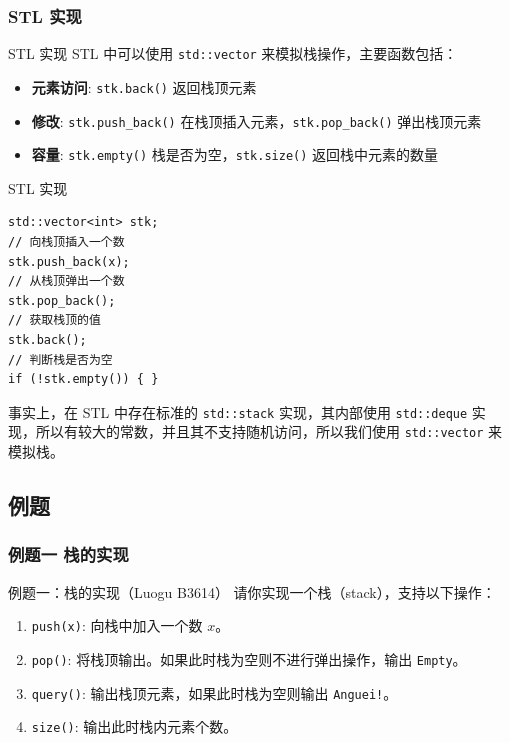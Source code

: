 \documentclass{beamer}
\begin{document}
\subsubsection{STL 实现}
\begin{frame}[fragile]{STL 实现}
    STL 中可以使用 \texttt{std::vector} 来模拟栈操作，主要函数包括：
    \begin{itemize}
        \item \textbf{元素访问}: \texttt{stk.back()} 返回栈顶元素
        \item \textbf{修改}: \texttt{stk.push_back()} 在栈顶插入元素，\texttt{stk.pop_back()} 弹出栈顶元素
        \item \textbf{容量}: \texttt{stk.empty()} 栈是否为空，\texttt{stk.size()} 返回栈中元素的数量
    \end{itemize}
\end{frame}

\begin{frame}[fragile]{STL 实现}
    \begin{verbatim}
std::vector<int> stk;
// 向栈顶插入一个数
stk.push_back(x);
// 从栈顶弹出一个数
stk.pop_back();
// 获取栈顶的值
stk.back();
// 判断栈是否为空
if (!stk.empty()) { }
    \end{verbatim}
\end{frame}

\begin{frame}
    事实上，在 STL 中存在标准的 \texttt{std::stack} 实现，其内部使用 \texttt{std::deque} 实现，所以有较大的常数，并且其不支持随机访问，所以我们使用 \texttt{std::vector} 来模拟栈。
\end{frame}

\subsection{例题}
\subsubsection{例题一 栈的实现}
\begin{frame}{例题一：栈的实现（Luogu B3614）}
    请你实现一个栈（stack），支持以下操作：
    \begin{enumerate}
        \item \texttt{push(x)}: 向栈中加入一个数 $x$。
        \item \texttt{pop()}: 将栈顶输出。如果此时栈为空则不进行弹出操作，输出 \texttt{Empty}。
        \item \texttt{query()}: 输出栈顶元素，如果此时栈为空则输出 \texttt{Anguei!}。
        \item \texttt{size()}: 输出此时栈内元素个数。
    \end{enumerate}
\end{frame}
\end{document}
